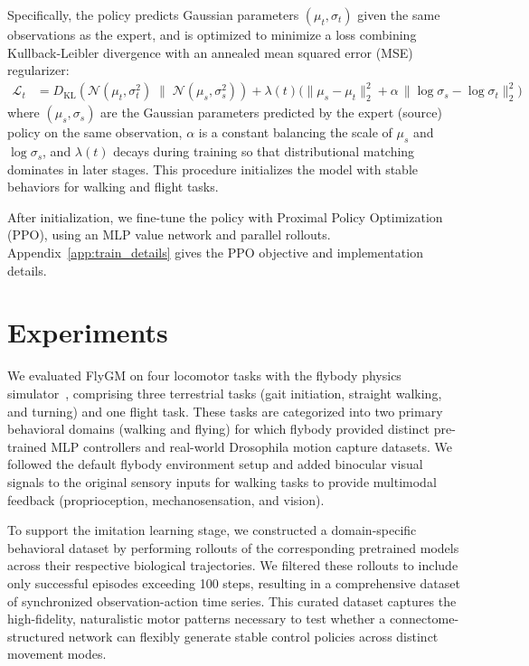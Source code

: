 \documentclass[a4paper]{easychair}
\begin{document}
Specifically, the policy predicts Gaussian parameters $(\mu_t, \sigma_t)$ given the same observations as the expert, and is optimized to minimize a loss combining Kullback-Leibler divergence with an annealed mean squared error (MSE) regularizer:
\begin{equation}
\begin{aligned}
    \mathcal{L}_t &= D_{\mathrm{KL}}\!\left( \mathcal{N}(\mu_t, \sigma_t^2) \;\|\; \mathcal{N}(\mu_s, \sigma_s^2) \right) + \lambda(t) \Big( \|\mu_s - \mu_t\|_2^2 + \alpha \,\|\log \sigma_s - \log \sigma_t\|_2^2 \Big)
\end{aligned}
\end{equation}
where $(\mu_s, \sigma_s)$ are the Gaussian parameters predicted by the expert (source) policy on the same observation, $\alpha$ is a constant balancing the scale of $\mu_s$ and $\log \sigma_s$, and $\lambda(t)$ decays during training so that distributional matching dominates in later stages. This procedure initializes the model with stable behaviors for walking and flight tasks.

After initialization, we fine-tune the policy with Proximal Policy Optimization (PPO), using an MLP value network and parallel rollouts. Appendix~\ref{app:train_details} gives the PPO objective and implementation details.


\section{Experiments}

We evaluated FlyGM on four locomotor tasks with the flybody physics simulator~\citep{Vaxenburg2025}, comprising three terrestrial tasks (gait initiation, straight walking, and turning) and one flight task. These tasks are categorized into two primary behavioral domains (walking and flying) for which flybody provided distinct pre-trained MLP controllers and real-world Drosophila motion capture datasets. We followed the default flybody environment setup and added binocular visual signals to the original sensory inputs for walking tasks to provide multimodal feedback (proprioception, mechanosensation, and vision).

To support the imitation learning stage, we constructed a domain-specific behavioral dataset by performing rollouts of the corresponding pretrained models across their respective biological trajectories. We filtered these rollouts to include only successful episodes exceeding 100 steps, resulting in a comprehensive dataset of synchronized observation-action time series. This curated dataset captures the high-fidelity, naturalistic motor patterns necessary to test whether a connectome-structured network can flexibly generate stable control policies across distinct movement modes.
\end{document}
